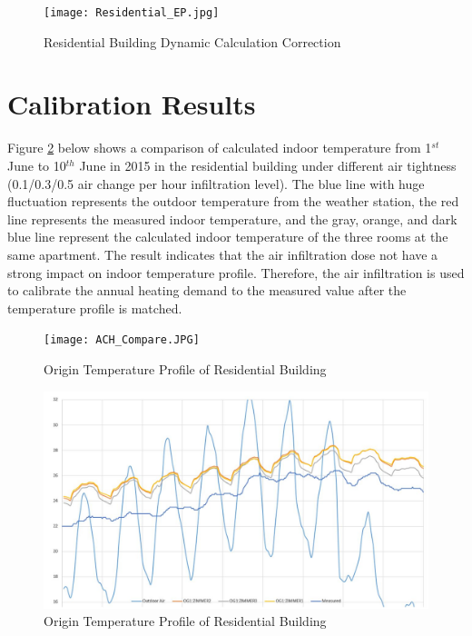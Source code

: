 		\begin{figure}[h!]
		\centering
		\texttt{[image: Residential\_EP.jpg]}
		\caption{Residential Building Dynamic Calculation Correction}
		\label{fig:Hongger_EP}
		\end{figure}
		
		




	\section{Calibration Results}

			Figure \ref{fig:ACH_Compare} below shows a comparison of calculated indoor temperature from 1$^{st}$ June to 10$^{th}$ June in 2015 in the residential building under different air tightness (0.1/0.3/0.5 air change per hour infiltration level). The blue line with huge fluctuation represents the outdoor temperature from the weather station, the red line represents the measured indoor temperature, and the gray, orange, and dark blue line represent the calculated indoor temperature of the three rooms at the same apartment. The result indicates that the air infiltration dose not have a strong impact on indoor temperature profile. Therefore, the air infiltration is used to calibrate the annual heating demand to the measured value after the temperature profile is matched.\\
		
			\begin{figure}[H]
			\centering
			\texttt{[image: ACH\_Compare.JPG]}
			\caption{Origin Temperature Profile of Residential Building}
			\label{fig:ACH_Compare}
			\end{figure}

			\begin{figure}[H]
			\centering
			\includegraphics[scale=0.5]{Figure/Hongg_Clibration_Origin.JPG}
			\caption{Origin Temperature Profile of Residential Building}
			\label{fig:HonggCalibrationOrigin}
			\end{figure}
			
